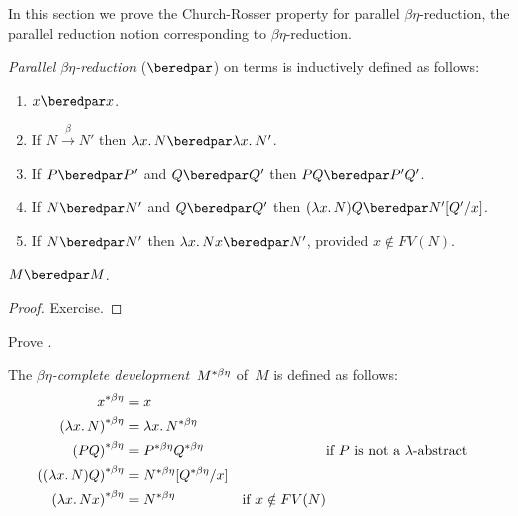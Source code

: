 \documentclass[../../../include/open-logic-section]{subfiles}
\begin{document}


In this section we prove the Church-Rosser property for parallel
$\beta\eta$-reduction, the parallel reduction notion corresponding to
$\beta\eta$-reduction. 

\begin{defn} 
  \emph{Parallel $\beta\eta$-reduction} ($\beredpar$) on terms is
  inductively defined as follows:
  \begin{enumerate}
    \item {} $x \beredpar x$.
    \item {} If $N \xrightarrow{\beta} N'$ then $\lambd[x][N] \beredpar
      \lambd[x][N']$.
    \item {} If $P \beredpar P'$ and $Q \beredpar Q'$ then $PQ \beredpar
      P'Q'$.
    \item {} If $N \beredpar N'$ and $Q \beredpar Q'$ then
      $(\lambd[x][N])Q \beredpar \Subst{N'}{Q'}{x}$.
    \item {} If $N \beredpar N'$ then $\lambd[x][Nx]
      \beredpar N'$, provided $x \notin FV(N)$.
  \end{enumerate}
\end{defn}

\begin{thm}
  $M \beredpar M$.
\end{thm}

\begin{proof}
  Exercise.
\end{proof}

\begin{prob}
  Prove .
\end{prob}

\begin{defn}
  The \emph{$\beta\eta$-complete development}~$\becd{M}$ of~$M$ is defined
  as follows:
  \begin{align}
    \becd{x} &= x \ollabel{defn:becd1} \\
    \becd{(\lambd[x][N])} &= \lambd[x][\becd{N}] \ollabel{defn:becd2}\\
    \becd{(PQ)} &= \becd{P}\becd{Q} && \text{if $P$ is not a $\lambd$-abstract} 
    \ollabel{defn:becd3} \\
    \becd{((\lambd[x][N])Q)} &= \Subst{\becd{N}}{\becd{Q}}{x}
                             \ollabel{defn:becd4} \\
    \becd{(\lambd[x][Nx])} &= \becd{N} \ollabel{defn:becd5} & \text{if $x
                                                      \notin FV(N)$}
  \end{align}
\end{defn}
\end{document}
